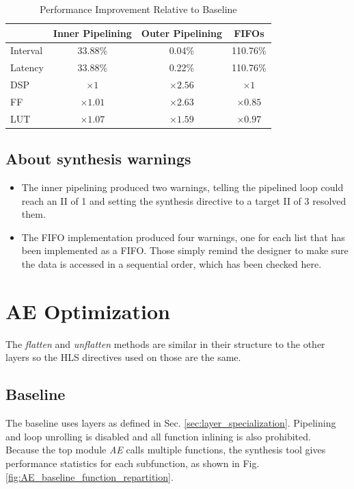\documentclass[11pt,a4paper]{article}
\begin{document}
\begin{table}[htbp]
    \centering
    \caption{Performance Improvement Relative to Baseline}
    \label{tab:layer_performance_improvement}
    \begin{tabular}{l|ccc}
        \toprule
        &\textbf{Inner Pipelining} & \textbf{Outer Pipelining} & \textbf{FIFOs} \\
        \midrule
        Interval & 33.88\% & 0.04\% & 110.76\% \\
        Latency & 33.88\% & 0.22\% & 110.76\% \\
        \midrule
        DSP & $\times 1$ & $\times 2.56$ & $\times 1$ \\
        FF & $\times 1.01$ & $\times 2.63$ & $\times 0.85$ \\
        LUT & $\times 1.07$ & $\times 1.59$ & $\times 0.97$ \\
        \bottomrule
    \end{tabular}
\end{table}

\subsection{About synthesis warnings}
\begin{itemize}
    \item The inner pipelining produced two warnings, telling the pipelined loop could reach an II of 1 and setting the synthesis directive to a target II of 3 resolved them.
    \item The FIFO implementation produced four warnings, one for each list that has been implemented as a FIFO. Those simply remind the designer to make sure the data is accessed in a sequential order, which has been checked here.
\end{itemize}

\section{AE Optimization}
\label{sec:ae_optimization}

The \textit{flatten} and \textit{unflatten} methods are similar in their structure to the other layers so the HLS directives used on those are the same. 

\subsection{Baseline}
The baseline uses layers as defined in Sec. \ref{sec:layer_specialization}. Pipelining and loop unrolling is disabled and all function inlining is also prohibited. \\
Because the top module \textit{AE} calls multiple functions, the synthesis tool gives performance statistics for each subfunction, as shown in Fig. \ref{fig:AE_baseline_function_repartition}.
\end{document}
